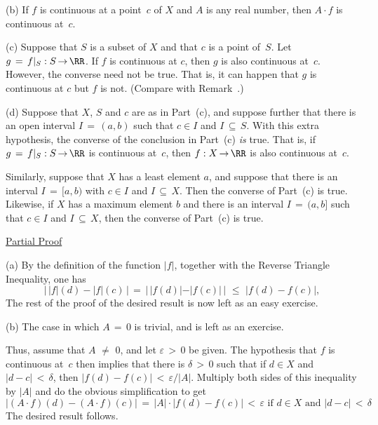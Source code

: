         (b) If $f$ is continuous at a point~$c$ of $X$ and $A$ is any real number, then $A{\cdot}f$ is continuous at~$c$.


\V

        (c) Suppose that $S$ is a subset of $X$ and that $c$ is a point of~$S$. Let $g \,=\, f|_{S}:S \,{\rightarrow}\, {\RR}$.
    If $f$ is continuous at $c$, then $g$ is also continuous at~$c$. However, the converse need not be true.
    That is, it can happen that $g$ is continuous at $c$ but $f$ is not. (Compare with Remark~.)

\V

        (d) Suppose that $X$, $S$ and $c$ are as in Part~(c), and suppose further that there is an open interval $I \,=\, (a,b)$ such that
    $c{\in}I$ and $I \,{\subseteq}\, S$. With this extra hypothesis, the converse of the conclusion in Part~(c) {\em is} true.
    That is, if $g \,=\, f|_{S}:S \,{\rightarrow}\, {\RR}$ is continuous at~$c$, then $f:X \,{\rightarrow}\, {\RR}$ is also continuous at~$c$.

        Similarly, suppose that $X$ has a least element $a$, and suppose that there is an interval $I \,=\, [a,b)$ with $c{\in}I$ and $I \,{\subseteq}\, X$.
    Then the converse of Part~(c) is true. Likewise, if $X$ has a maximum element $b$ and there is an interval $I \,=\, (a,b]$ such that $c{\in}I$ and $I \,{\subseteq}\, X$, then the converse of Part~(c) is true.

\V

        \underline{Partial Proof}

\V

        (a) By the definition of the function $|f|$, together with the Reverse Triangle Inequality, one has
        \begin{displaymath}
        |\,|f|(d) - |f|(c)\,| \,=\, |\,|f(d)|-|f(c)|\,|\,\,{\leq}\,\,|f(d)-f(c)|,
        \end{displaymath}
    The rest of the proof of the desired result is now left as an easy exercise.

\V

        (b) The case in which $A \,=\, 0$ is trivial, and is left as an exercise.

        Thus, assume that $A \,\,{\neq}\,\, 0$, and let ${\varepsilon}\,>\,0$ be given.
    The hypothesis that $f$ is continuous at~$c$ then implies that there is ${\delta}\,>\,0$ such that if $d{\in}X$ and $|d-c|\,<\,{\delta}$,
    then $|f(d)-f(c)|\,<\,{\varepsilon}/|A|$. Multiply both sides of this inequality by $|A|$ and do the obvious simplification to get
        \begin{displaymath}
        |(A{\cdot}f)(d) - (A{\cdot}f)(c)| \,=\, |A|{\cdot}|f(d) - f(c)|\,<\,{\varepsilon} \mbox{ if $d{\in}X$ and $|d-c|\,<\,{\delta}$}
        \end{displaymath}
    The desired result follows.


